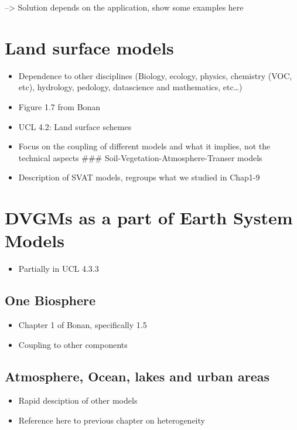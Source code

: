 \documentclass[oneside]{book}
\providecommand{\tightlist}{%
  \setlength{\itemsep}{0pt}\setlength{\parskip}{0pt}}
\begin{document}
--\textgreater{} Solution depends on the application, show some examples
here

\section{Land surface models}\label{land-surface-models}

\begin{itemize}
\tightlist
\item
  Dependence to other disciplines (Biology, ecology, physics, chemistry
  (VOC, etc), hydrology, pedology, datascience and mathematics,
  etc\ldots{})
\item
  Figure 1.7 from Bonan
\item
  UCL 4.2: Land surface schemes
\item
  Focus on the coupling of different models and what it implies, not the
  technical aspects \#\#\# Soil-Vegetation-Atmosphere-Transer models
\item
  Description of SVAT models, regroups what we studied in Chap1-9
\end{itemize}

\section{DVGMs as a part of Earth System
Models}\label{dvgms-as-a-part-of-earth-system-models}

\begin{itemize}
\tightlist
\item
  Partially in UCL 4.3.3
\end{itemize}

\subsection{One Biosphere}\label{one-biosphere}

\begin{itemize}
\tightlist
\item
  Chapter 1 of Bonan, specifically 1.5
\item
  Coupling to other components
\end{itemize}

\subsection{Atmosphere, Ocean, lakes and urban
areas}\label{atmosphere-ocean-lakes-and-urban-areas}

\begin{itemize}
\tightlist
\item
  Rapid desciption of other models
\item
  Reference here to previous chapter on heterogeneity
\end{itemize}
\end{document}
